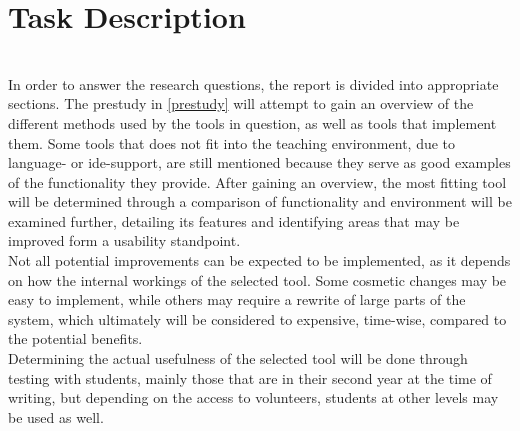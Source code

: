 \section{Task Description}\label{Task Description}%
~\\
In order to answer the research questions, the report is divided into appropriate sections.
The prestudy in \autoref{prestudy} will attempt to gain an overview of the different methods used by the tools in question, as well as tools that implement them.
Some tools that does not fit into the teaching environment, due to language- or \gls{ide}-support, are still mentioned because they serve as good examples of the functionality they provide.
After gaining an overview, the most fitting tool will be determined through a comparison of functionality and environment will be examined further, detailing its features and identifying areas that may be improved form a usability standpoint.
~\\

Not all potential improvements can be expected to be implemented, as it depends on how the internal workings of the selected tool.
Some cosmetic changes may be easy to implement, while others may require a rewrite of large parts of the system, which ultimately will be considered to expensive, time-wise, compared to the potential benefits.
~\\

Determining the actual usefulness of the selected tool will be done through testing with students, mainly those that are in their second year at the time of writing, but depending on the access to volunteers, students at other levels may be used as well.
~\\